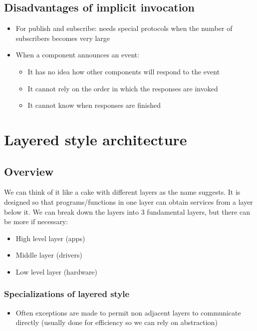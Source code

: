 \documentclass[12pt]{book}
\begin{document}
\section{Disadvantages of implicit invocation}

\begin{itemize}
    \item For publish and subscribe: needs special protocols when the number of subscribers becomes very large
    \item When a component announces an event:
    \begin{itemize}
        \item It has no idea how other components will respond to the event
        \item It cannot rely on the order in which the responses are invoked
        \item It cannot know when responses are finished
    \end{itemize}
\end{itemize}

\chapter{Layered style architecture}

\section{Overview}
We can think of it like a cake with different layers as the name suggests. It is designed so that programs/functions in one layer can obtain services from a layer below it. We can break down the layers into 3 fundamental layers, but there can be more if necessary:

\begin{itemize}
    \item High level layer (apps)
    \item Middle layer (drivers)
    \item Low level layer (hardware)
\end{itemize} 

\subsection{Specializations of layered style}

\begin{itemize}
    \item Often exceptions are made to permit non adjacent layers to communicate directly (usually done for efficiency so we can rely on abstraction)
\end{itemize}
\end{document}
